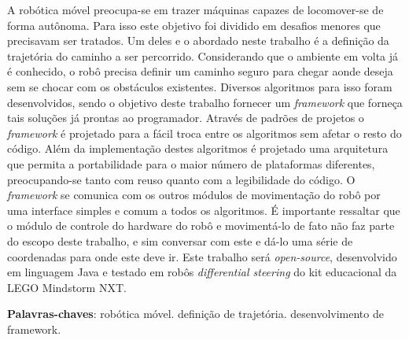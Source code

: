\begin{resumo}
A robótica móvel preocupa-se em trazer máquinas capazes de locomover-se de forma autônoma. Para isso este objetivo foi dividido em desafios menores que precisavam ser tratados. Um deles e o abordado neste trabalho é a definição da trajetória do caminho a ser percorrido. Considerando que o ambiente em volta já é conhecido, o robô precisa definir um caminho seguro para chegar aonde deseja sem se chocar com os obstáculos existentes. Diversos algoritmos para isso foram desenvolvidos, sendo o objetivo deste trabalho fornecer um \textit{framework} que forneça tais soluções já prontas ao programador. Através de padrões de projetos o \textit{framework} é projetado para a fácil troca entre os algoritmos sem afetar o resto do código. Além da implementação destes algoritmos é projetado uma arquitetura que permita a portabilidade para o maior número de plataformas diferentes, preocupando-se tanto com reuso quanto com a legibilidade do código. O \textit{framework} se comunica com os outros módulos de movimentação do robô por uma interface simples e comum a todos os algoritmos. É importante ressaltar que o módulo de controle do hardware do robô e movimentá-lo de fato não faz parte do escopo deste trabalho, e sim conversar com este e dá-lo uma série de coordenadas para onde este deve ir. Este trabalho será \textit{open-source}, desenvolvido em linguagem Java e testado em robôs \textit{differential steering} do kit educacional da LEGO Mindstorm NXT.

 \vspace{\onelineskip}
    
 \noindent
 \textbf{Palavras-chaves}: robótica móvel. definição de trajetória. desenvolvimento de framework.
\end{resumo}
